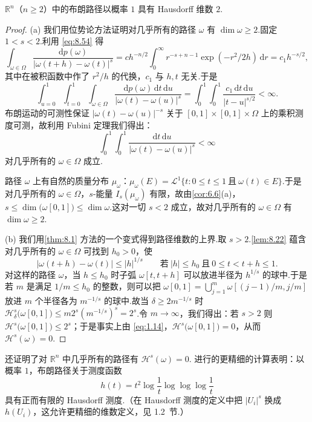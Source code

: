 \begin{theorem}\label{thm:8.23}
$\mathbb{R}^n$（$n\geq 2$）中的布朗路径以概率 $1$ 具有 Hausdorff 维数 $2$.
\end{theorem}

\begin{proof}
(a) 我们用位势论方法证明对几乎所有的路径 $\omega$ 有 $\dim\omega\geq 2$.固定 $1<s<2$.利用 \eqref{eq:8.54} 得
\[
  \int_{\omega\in\Omega}\frac{\mathrm{d}p(\omega)}{|\omega(t+h)-\omega(t)|^{s}}
  =ch^{-n/2}\int_{0}^{\infty}r^{-s+n-1}\exp(-r^{2}/2h)\,\mathrm{d}r
  =c_1h^{-s/2},
\]
其中在被积函数中作了 $r^2/h$ 的代换，$c_1$ 与 $h,t$ 无关.于是
\[
  \int_{u=0}^{1}\int_{t=0}^{1}\int_{\omega\in\Omega}\frac{\mathrm{d}p(\omega)\,\mathrm{d}t\,\mathrm{d}u}{|\omega(t)-\omega(u)|^{s}}
  =\int_{0}^{1}\int_{0}^{1}\frac{c_1\,\mathrm{d}t\,\mathrm{d}u}{|t-u|^{s/2}}<\infty.
\]
布朗运动的可测性保证 $|\omega(t)-\omega(u)|^{-s}$ 关于 $[0,1]\times[0,1]\times\Omega$ 上的乘积测度可测，故利用 Fubini 定理我们得出：
\[
  \int_{0}^{1}\int_{0}^{1}\frac{\mathrm{d}t\,\mathrm{d}u}{|\omega(t)-\omega(u)|^{s}}<\infty
\]
对几乎所有的 $\omega\in\Omega$ 成立.

路径 $\omega$ 上有自然的质量分布 $\mu_\omega$：$\mu_\omega(E)=\mathscr{L}^{1}\{t:0\leq t\leq 1\ \text{且}\ \omega(t)\in E\}$.于是对几乎所有的 $\omega\in\Omega$，$s$-能量 $I_s(\mu_\omega)$ 有限，故由\cref{cor:6.6}(a)，$s\leq\dim\bigl(\omega[0,1]\bigr)\leq\dim\omega$.这对一切 $s<2$ 成立，故对几乎所有的 $\omega\in\Omega$ 有 $\dim\omega\geq 2$.

(b) 我们用\cref{thm:8.1} 方法的一个变式得到路径维数的上界.取 $s>2$.\cref{lem:8.22} 蕴含对几乎所有的 $\omega\in\Omega$ 可找到 $h_0>0$，使
\[
  |\omega(t+h)-\omega(t)|\leq|h|^{1/s}
  \qquad\text{若}\ |h|\leq h_0\ \text{且}\ 0\leq t<t+h\leq 1.
\]
对这样的路径 $\omega$，当 $h\leq h_0$ 时子弧 $\omega[t,t+h]$ 可以放进半径为 $h^{1/s}$ 的球中.于是若 $m$ 是满足 $1/m\leq h_0$ 的整数，则可以把 $\omega[0,1]=\bigcup_{j=1}^{m}\omega[(j-1)/m,j/m]$ 放进 $m$ 个半径各为 $m^{-1/s}$ 的球中.故当 $\delta\geq 2m^{-1/s}$ 时 $\mathcal{H}^s_{\delta}\bigl(\omega[0,1]\bigr)\leq m2^s(m^{-1/s})^s=2^s$.令 $m\to\infty$，我们得出：若 $s>2$ 则 $\mathcal{H}^s\bigl(\omega[0,1]\bigr)\leq 2^s$；于是事实上由 \eqref{eq:1.14}，$\mathcal{H}^s\bigl(\omega[0,1]\bigr)=0$，从而 $\mathcal{H}^s(\omega)=0$.
\end{proof}

\textcite{taylor1953} 还证明了对 $\mathbb{R}^n$ 中几乎所有的路径有 $\mathcal{H}^s(\omega)=0$.\textcites{ray1963,taylor1964} 进行的更精细的计算表明：以概率 $1$，布朗路径关于测度函数
\[
  h(t)=t^{2}\log\frac{1}{t}\log\log\log\frac{1}{t}
\]
具有正而有限的 Hausdorff 测度.（在 Hausdorff 测度的定义中把 $|U_i|^s$ 换成 $h(U_i)$，这允许更精细的维数定义，见 1.2~节.）

